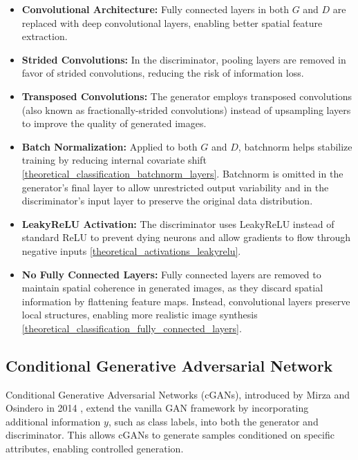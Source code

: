 \begin{itemize}
    \item \textbf{Convolutional Architecture:} Fully connected layers in both \(G\) and \(D\) are replaced with deep convolutional layers, enabling better spatial feature extraction.
    \item \textbf{Strided Convolutions:} In the discriminator, pooling layers are removed in favor of strided convolutions, reducing the risk of information loss.
    \item \textbf{Transposed Convolutions:} The generator employs transposed convolutions (also known as fractionally-strided convolutions) instead of upsampling layers to improve the quality of generated images.
    \item \textbf{Batch Normalization:} Applied to both \(G\) and \(D\), batchnorm helps stabilize training by reducing internal covariate shift \ref{theoretical_classification_batchnorm_layers}. Batchnorm is omitted in the generator’s final layer to allow unrestricted output variability and in the discriminator’s input layer to preserve the original data distribution.
    \item \textbf{LeakyReLU Activation:} The discriminator uses LeakyReLU instead of standard ReLU to prevent dying neurons and allow gradients to flow through negative inputs \ref{theoretical_activations_leakyrelu}.
    \item \textbf{No Fully Connected Layers:} Fully connected layers are removed to maintain spatial coherence in generated images, as they discard spatial information by flattening feature maps. Instead, convolutional layers preserve local structures, enabling more realistic image synthesis \ref{theoretical_classification_fully_connected_layers}.
\end{itemize}


\subsection[Conditional Generative Adversarial Network - cGAN]{Conditional Generative Adversarial Network}\label{theoretical_cgan}

Conditional Generative Adversarial Networks (cGANs), introduced by Mirza and Osindero in 2014 \cite{mirza2014conditionalgenerativeadversarialnets}, extend the vanilla GAN framework by incorporating additional information \(y\), such as class labels, into both the generator and discriminator. This allows cGANs to generate samples conditioned on specific attributes, enabling controlled generation.

